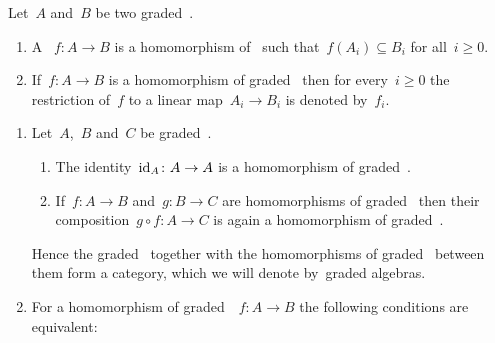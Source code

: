 \begin{definition}
  Let~$A$ and~$B$ be two graded~\algebras{$\kf$}.
  \begin{enumerate}
    \item
      A ~$f \colon A \to B$ is a homomorphism of~{\algebras{$\kf$}} such that~$f(A_i) \subseteq B_i$ for all~$i \geq 0$.
    \item
      If~$f \colon A \to B$ is a homomorphism of graded~{\algebras{$\kf$}} then for every~$i \geq 0$ the restriction of~$f$ to a linear map~$A_i \to B_i$ is denoted by~$f_i$.
  \end{enumerate}
\end{definition}


\begin{remark}
  \leavevmode
  \begin{enumerate}
    \item
      Let~$A$,~$B$ and~$C$ be graded~{\algebra{$\kf$}}.
      \begin{enumerate}
        \item
          The identity~$\id_A \colon A \to A$ is a homomorphism of graded~{\algebras{$\kf$}}.
        \item
          If~$f \colon A \to B$ and~$g \colon B \to C$ are homomorphisms of graded~{\algebras{$\kf$}} then their composition~$g \circ f \colon A \to C$ is again a homomorphism of graded~{\algebras{$\kf$}}.
      \end{enumerate}
      Hence the graded~\algebras{$\kf$} together with the homomorphisms of graded~\algebras{$\kf$} between them form a category, which we will denote by~\gls*{graded algebras}.
    \item
      For a homomorphism of graded~{\algebras{$\kf$}}~$f \colon A \to B$ the following conditions are equivalent:
  \end{enumerate}
\end{remark}


